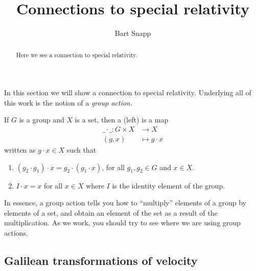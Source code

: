 \documentclass[12pt,noauthor,nooutcomes,handout,hints,newpage]{ximera}
\author{Bart Snapp}
\title{Connections to special relativity}
\begin{document}
\begin{abstract}
Here we see a connection to special relativity.
\end{abstract}
\maketitle

In this section we will show a connection to special
relativity. Underlying all of this work is the notion of a
\textit{group action}.

\begin{definition}
  If $G$ is a group and $X$ is a set, then a (left)  is a map
  \begin{align*}
    \_\cdot\_: G\times X &\to X\\
    (g,x) &\mapsto g\cdot x
  \end{align*}
  written as $g\cdot x \in X$ such that
  \begin{enumerate}
  \item $(g_2\cdot g_1)\cdot x = g_2\cdot (g_1\cdot x)$, for all $g_1,
    g_2\in G$ and $x\in X$.
  \item $I\cdot x = x$ for all $x\in X$ where $I$ is the identity
    element of the group.
  \end{enumerate}
\end{definition}
In essence, a group action tells you how to ``multiply'' elements of a
group by elements of a set, and obtain an element of the set as a
result of the multiplication. As we work, you should try to see where
we are using group actions.

\subsection{Galilean transformations of velocity}
\end{document}
